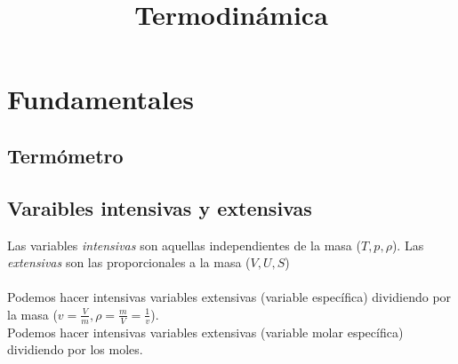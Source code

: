 \documentclass{myclass}
\title{Termodinámica}
\begin{document}
\maketitle
\tableofcontents
\newpage

\section{Fundamentales}

\subsection{Termómetro}

\subsection{Varaibles intensivas y extensivas}
Las variables \textit{intensivas} son aquellas independientes de la masa ($T, p, \rho$).
Las \textit{extensivas} son las proporcionales a la masa ($V, U, S$) \\
\\
Podemos hacer intensivas variables extensivas (variable específica) dividiendo por la masa ($v = \frac{V}{m}, \rho = \frac{m}{V} = \frac{1}{v}$). \\
Podemos hacer intensivas variables extensivas (variable molar específica) dividiendo por los moles.
\end{document}
